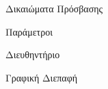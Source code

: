 
\gl
{}
{Δικαιώματα Πρόσβασης}



\gl
{}
{Παράμετροι}




\gl
{}
{}


\gl
{}
{Διευθηντήριο}


\gl
{}
{}

\gl
{}
{Γραφική Διεπαφή}